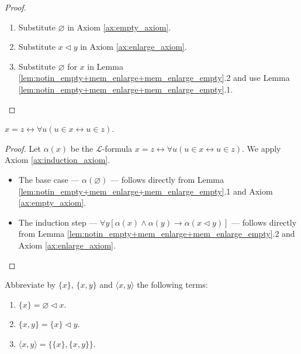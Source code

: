 \begin{proof}
    \leanok
    \leavevmode
    \begin{enumerate}
        \item Substitute $\varnothing$ in Axiom \ref{ax:empty_axiom}.
        \item Substitute $x \lhd y$ in Axiom \ref{ax:enlarge_axiom}.
        \item Substitute $\varnothing$ for $x$ in Lemma 
        \ref{lem:notin_empty+mem_enlarge+mem_enlarge_empty}.2 and use Lemma 
        \ref{lem:notin_empty+mem_enlarge+mem_enlarge_empty}.1.
    \end{enumerate}
\end{proof}

\begin{theorem}
    \label{thm:exten_prop}
    \leanok
    $x=z \leftrightarrow \forall u (u \in x \leftrightarrow u \in z)$.
\end{theorem}

\begin{proof}
    \leanok
    Let $\alpha (x)$ be the $\mathcal{L}$-formula
    $x=z \leftrightarrow \forall u (u \in x \leftrightarrow u \in z)$.
    We apply Axiom \ref{ax:induction_axiom}.
    \begin{itemize}
        \item The base case — $\alpha (\varnothing)$ — follows directly from Lemma 
        \ref{lem:notin_empty+mem_enlarge+mem_enlarge_empty}.1 and Axiom \ref{ax:empty_axiom}.
        \item The induction step — 
        $\forall y[\alpha(x) \land \alpha(y) \rightarrow \alpha(x \lhd y)]$ — 
        follows directly from Lemma \ref{lem:notin_empty+mem_enlarge+mem_enlarge_empty}.2 and 
        Axiom \ref{ax:enlarge_axiom}.
    \end{itemize}
\end{proof}

\begin{definition}
    \label{def:singleton+pair}
    \leanok
    Abbreviate by $\{x\}$, $\{x,y\}$ and $\langle x,y\rangle$ the following terms:
    \begin{enumerate}
        \item $\{x\} = \varnothing \lhd x$.
        \item $\{x,y\} = \{x\} \lhd y$.
        \item $\langle x,y\rangle = \{\{x\}, \{x,y\}\}$.
    \end{enumerate}
\end{definition}

